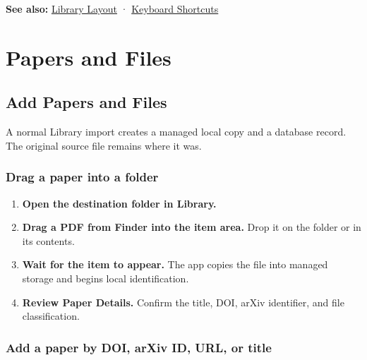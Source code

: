 \documentclass[10pt,letterpaper,oneside]{scrreprt}
\providecommand{\tightlist}{\setlength{\itemsep}{1pt}\setlength{\parskip}{0pt}}
\newenvironment{GewuRelated}{\par\nobreak\vspace{3pt}\nobreak\begingroup\small\sffamily\begin{samepage}\noindent}{\par\end{samepage}\endgroup}
\newenvironment{GewuLead}
  {\begin{list}{}{\leftmargin=0pt\rightmargin=0pt\topsep=0pt\partopsep=0pt\parsep=0pt}\item\relax
    \sffamily\fontsize{10.5}{13.2}\selectfont\color{GewuMuted}}
  {\end{list}}
\begin{document}
\begin{GewuRelated}
\textbf{See also:} \hyperref[library-layout]{Library Layout} · \hyperref[keyboard]{Keyboard Shortcuts}
\end{GewuRelated}

\chapter{Papers and Files}\label{chapter-12}

\section{Add Papers and Files}\label{import-files}

\begin{GewuLead}
A normal Library import creates a managed local copy and a database record. The original source file remains where it was.
\end{GewuLead}

\subsection{Drag a paper into a folder}\label{drag-a-paper-into-a-folder}

\begin{enumerate}
\tightlist
\item
  \textbf{Open the destination folder in \textbf{Library}.}
\item
  \textbf{Drag a PDF from Finder into the item area.} Drop it on the folder or in its contents.
\item
  \textbf{Wait for the item to appear.} The app copies the file into managed storage and begins local identification.
\item
  \textbf{Review Paper Details.} Confirm the title, DOI, arXiv identifier, and file classification.
\end{enumerate}

\subsection{Add a paper by DOI, arXiv ID, URL, or title}\label{add-a-paper-by-doi-arxiv-id-url-or-title}
\end{document}
